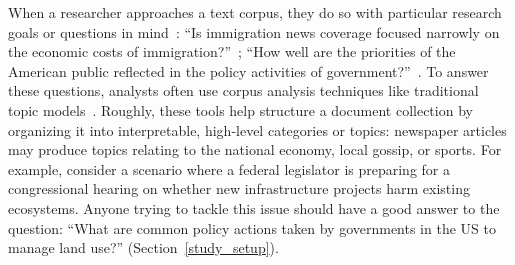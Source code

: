 

% 
When a researcher approaches a text corpus, they do so with particular
research goals or questions in mind~\cite{krippendorff2004content}:
%
``Is immigration news coverage focused narrowly on the economic costs
of immigration?''~\cite{annesley2013investigating}; ``How well are the
priorities of the American public reflected in the policy activities
of government?''~\cite{governing}.
%
To answer these questions, analysts often use corpus analysis
techniques like traditional topic models~\cite[Section~\ref{background}]{blei2003lda}.
%
Roughly, these tools help structure a document collection by organizing it into
interpretable, high-level categories or topics: newspaper
articles may produce topics relating to the national economy, local
gossip, or sports.
%
%
For example, consider a scenario where a federal legislator is
preparing for a congressional hearing on whether new infrastructure
projects harm existing ecosystems.
%
Anyone trying to tackle this issue should have a good answer to the
question: ``What are common policy actions taken by governments in the
US to manage land use?'' (Section~\ref{study_setup}).
%


